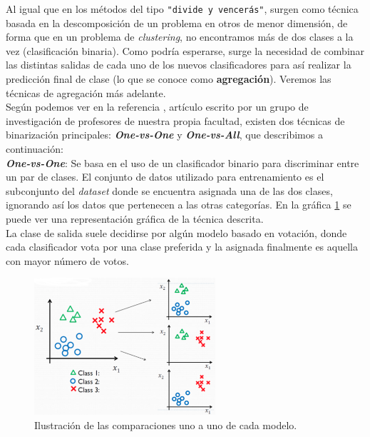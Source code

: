\documentclass[]{article}
\begin{document}
			Al igual que en los métodos del tipo \verb|"divide y vencerás"|, surgen como técnica basada en la descomposición de un problema en otros de menor dimensión, de forma que en un problema de \textit{clustering}, no encontramos más de dos clases a la vez (clasificación binaria). Como podría esperarse, surge la necesidad de combinar las distintas salidas de cada uno de los nuevos clasificadores para así realizar la predicción final de clase (lo que se conoce como \textbf{agregación}). Veremos las técnicas de agregación más adelante.\\
			
			Según podemos ver en la referencia \cite{binary-classifiers}, artículo escrito por un grupo de investigación de profesores de nuestra propia facultad, existen dos técnicas de binarización principales: \textit{\textbf{One-vs-One}} y \textit{\textbf{One-vs-All}}, que describimos a continuación:\\
			
			{\large \textbf{\textit{One-vs-One}}}: Se basa en el uso de un clasificador binario para discriminar entre un par de clases. El conjunto de datos utilizado para entrenamiento es el subconjunto del \textit{dataset} donde se encuentra asignada una de las dos clases, ignorando así los datos que pertenecen a las otras categorías. En la gráfica \ref{one-vs-one} se puede ver una representación gráfica de la técnica descrita.\\
			
			La clase de salida suele decidirse por algún modelo basado en votación, donde cada clasificador vota por una clase preferida y la asignada finalmente es aquella con mayor número de votos.\\
			
			\begin{figure}[h]
				\centering
				\includegraphics[width=0.6\textwidth]{./img/one-vs-one}
				\caption{Ilustración de las comparaciones uno a uno de cada modelo. \cite{binarization-slides}}
				\label{one-vs-one}
			\end{figure}
			
\end{document}
